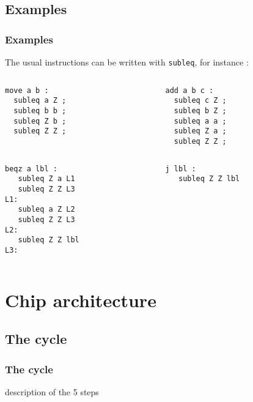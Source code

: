 \documentclass[slidestop]{beamer}
\begin{document}
\subsection{Examples}
\begin{frame}[fragile]
    \frametitle{Examples}
The usual instructions can be written with \texttt{subleq}, for instance :

\begin{columns}[t]
    \begin{column}[T]{5cm}
\begin{lstlisting}
move a b :
  subleq a Z ;
  subleq b b ;
  subleq Z b ;
  subleq Z Z ;

\end{lstlisting}
    \end{column}
    \begin{column}[T]{5cm}
\begin{lstlisting}
add a b c :
  subleq c Z ;
  subleq b Z ;
  subleq a a ;
  subleq Z a ;
  subleq Z Z ;
\end{lstlisting}
\end{column}
\end{columns}

\begin{columns}[t]
\begin{column}[T]{5cm}
\begin{lstlisting}
beqz a lbl :
   subleq Z a L1
   subleq Z Z L3
L1:
   subleq a Z L2
   subleq Z Z L3
L2:
   subleq Z Z lbl
L3:
\end{lstlisting}
\end{column}
\begin{column}[T]{5cm}
\begin{lstlisting}
j lbl :
   subleq Z Z lbl
\end{lstlisting}
\end{column}
\end{columns}
\end{frame}

\section{Chip architecture}
\subsection{The cycle}

\begin{frame}
    \frametitle{The cycle}
description of the 5 steps
\end{frame}
\end{document}
